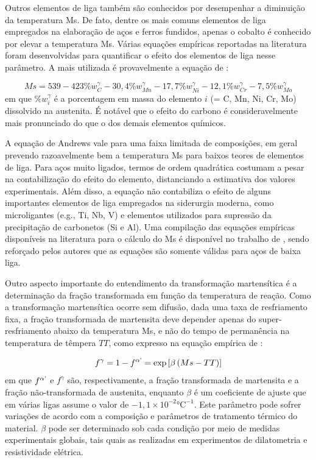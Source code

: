 Outros elementos de liga também são conhecidos por desempenhar a diminuição da temperatura Ms. De fato, dentre os mais comuns elementos de liga empregados na elaboração de  aços e ferros fundidos, apenas o cobalto é conhecido por elevar a temperatura Ms\cite{Honeycombe2006}. Várias equações empíricas reportadas na literatura foram desenvolvidas para quantificar o efeito dos elementos de liga nesse parâmetro. A mais utilizada é provavelmente a equação de :

\begin{equation}
	Ms = 539 - 423\%w_C^\gamma - 30,4\%w_{Mn}^\gamma - 17,7\%w_{Ni}^\gamma - 12,1\%w_{Cr}^\gamma - 7,5\%w_{Mo}^\gamma
	\label{eq:Andrews}
\end{equation}
%
em que $\%w_i^\gamma$ é a porcentagem em massa do elemento $i$ (= C, Mn, Ni, Cr, Mo) dissolvido na austenita. É notável que o efeito do carbono é consideravelmente mais pronunciado do que o dos demais elementos químicos.

A equação de Andrews vale para uma faixa limitada de composições, em geral prevendo razoavelmente bem a temperatura Ms para baixos teores de elementos de liga. Para aços muito ligados, termos de ordem quadrática costumam a pesar na contabilização do efeito do elemento, distanciando a estimativa dos valores experimentais. Além disso, a equação não contabiliza o efeito de alguns importantes elementos de liga empregados na siderurgia moderna, como microligantes (e.g., Ti, Nb, V) e elementos utilizados para supressão da precipitação de carbonetos (Si e Al). Uma compilação das equações empíricas disponíveis na literatura para o cálculo do Ms é disponível no trabalho de , sendo reforçado pelos autores que as equações são somente válidas para aços de baixa liga.

Outro aspecto importante do entendimento da transformação martensítica é a determinação da fração transformada em função da temperatura de reação. Como a transformação martensítica ocorre sem difusão, dada uma taxa de resfriamento fixa, a fração transformada de martensita deve depender apenas do super-resfriamento abaixo da temperatura Ms, e não do tempo de permanência na temperatura de têmpera $TT$, como expresso na equação empírica de :

\begin{equation}
	f^\gamma = 1 - f^{\alpha\text{\textquoteright}} = \exp \left[ \beta \left ( Ms - TT \right )\right ]
	\label{eq:KM}
\end{equation}
%
em que $f^{\alpha\text{\textquoteright}}$ e $f^\gamma$ são, respectivamente, a fração transformada de martensita e a fração não-transformada de austenita, enquanto $\beta$ é um coeficiente de ajuste que em várias ligas assume o valor de $-1,1 \times 10^{-2} \text{°C}^{-1}$. Este parâmetro pode sofrer variações de acordo com a composição e parâmetros de tratamento térmico do material. $\beta$ pode ser determinado sob cada condição por meio de medidas experimentais globais, tais quais as realizadas em experimentos de dilatometria e resistividade elétrica\cite{DeMoor2009}.

